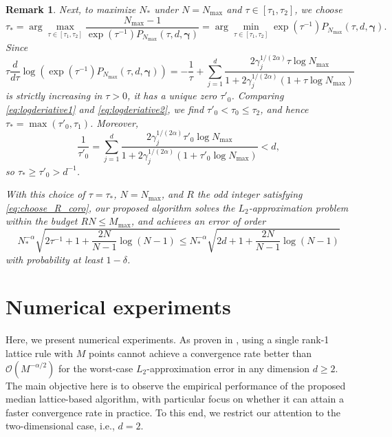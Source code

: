\documentclass[pdflatex,sn-basic,Numbered]{sn-jnl}%
\newcommand{\bsgamma}{\boldsymbol{\gamma}}
\theoremstyle{thmstyleone}%
\newtheorem{remark}[theorem]{Remark}
\theoremstyle{thmstyletwo}%
\begin{document}
\begin{remark}
    Next, to maximize $N_*$ under $N = N_{\max}$ and $\tau \in [\tau_1, \tau_2]$, we choose
    \[ 
     \tau_*=\arg\max_{\tau\in [\tau_1,\tau_2]}\frac{N_{\max}-1}{\exp(\tau^{-1})P_{N_{\max}} (\tau,d,\bsgamma)}=\arg\min_{\tau\in [\tau_1,\tau_2]}\exp(\tau^{-1})P_{N_{\max}} (\tau,d,\bsgamma).
     \]
     Since
     \begin{equation}\label{eq:logderiative2}
         \tau\frac{d}{d\tau}\log\left(\exp \left(\tau^{-1}\right)P_{N_{\max}} (\tau,d,\bsgamma)\right)=-\frac{1}{\tau}+\sum_{j=1}^d \frac{2\gamma_j^{1/(2\alpha)}\tau \log N_{\max} }{1+ 2\gamma_j^{1/(2\alpha)} (1+\tau\log N_{\max})}
     \end{equation}
      is strictly increasing in $\tau>0$, it has a unique zero $\tau'_0$. Comparing \eqref{eq:logderiative1} and \eqref{eq:logderiative2}, we find $\tau'_0<\tau_0\leq \tau_2$, and hence $\tau_*=\max(\tau'_0,\tau_1)$. Moreover,
      \[ 
      \frac{1}{\tau'_0}=\sum_{j=1}^d \frac{2\gamma_j^{1/(2\alpha)}\tau'_0 \log N_{\max} }{1+ 2\gamma_j^{1/(2\alpha)} (1+\tau'_0\log N_{\max})}<d,
      \]
      so $\tau_*\geq \tau'_0>d^{-1}$.
      
      With this choice of $\tau = \tau_*$, $N = N_{\max}$, and $R$ the odd integer satisfying \eqref{eq:choose_R_coro}, our proposed algorithm solves the $L_2$-approximation problem within the budget $RN \leq M_{\max}$, and achieves an error of order
      \[ 
      N^{-\alpha}_*\sqrt{2\tau^{-1}+1 + \frac{2N}{N-1}\log(N-1)}\leq N^{-\alpha}_*\sqrt{2d+1 + \frac{2N}{N-1}\log(N-1)}
      \]
      with probability at least $1-\delta$. 
\end{remark}


\section{Numerical experiments}\label{sec:numerics}
Here, we present numerical experiments. As proven in \cite{byrenheid2017tight}, using a single rank-1 lattice rule with $M$ points cannot achieve a convergence rate better than $\mathcal{O}(M^{-\alpha/2})$ for the worst-case $L_2$-approximation error in any dimension $d\ge 2$. The main objective here is to observe the empirical performance of the proposed median lattice-based algorithm, with particular focus on whether it can attain a faster convergence rate in practice. To this end, we restrict our attention to the two-dimensional case, i.e., $d = 2$.
\end{document}
